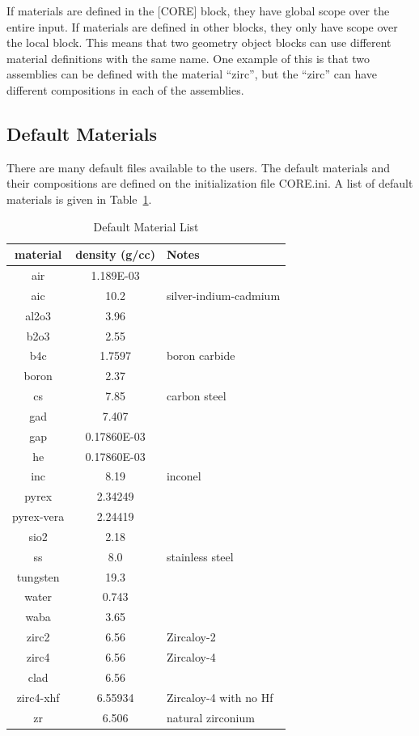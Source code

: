 If materials are defined in the [CORE] block, they have global scope over the entire input.
If materials are defined in other blocks, they only have scope over the local block.  This means
that two geometry object blocks can use different material definitions with the same name.
One example of this is that two assemblies can be defined with the material ``zirc'', but
the ``zirc'' can have different compositions in each of the assemblies.

\subsection{Default Materials}

There are many default files available to the users.  The default materials and their compositions
are defined on the initialization file CORE.ini.
A list of default materials is given in Table~\ref{table:mat}.
\begin{table}
\centering
\caption{Default Material List}
\label{table:mat}
\begin{tabular}{|c|c|l|}
\hline
  material  & density (g/cc)  & Notes \\
\hline
   air    &  1.189E-03  &        \\
   aic    &     10.2   &  silver-indium-cadmium      \\
   al2o3  &     3.96   &        \\
   b2o3   &     2.55   &        \\
   b4c    &   1.7597   &  boron carbide      \\
   boron  &     2.37   &        \\
   cs     &     7.85   &  carbon steel      \\
   gad    &     7.407  &        \\
   gap    & 0.17860E-03 &        \\
   he     & 0.17860E-03 &        \\
   inc    &    8.19    &  inconel      \\
   pyrex  &    2.34249 &        \\
   pyrex-vera& 2.24419 &        \\
   sio2     &   2.18   &        \\
   ss       &   8.0    &  stainless steel      \\
   tungsten &  19.3    &        \\
   water    &   0.743  &        \\
   waba     &   3.65   &        \\
   zirc2    &   6.56   &  Zircaloy-2      \\
   zirc4    &   6.56   &  Zircaloy-4      \\
   clad     &  6.56    &        \\
   zirc4-xhf&  6.55934 &  Zircaloy-4 with no Hf   \\
   zr       &  6.506   &  natural zirconium    \\
\hline
\end{tabular}
\end{table}

